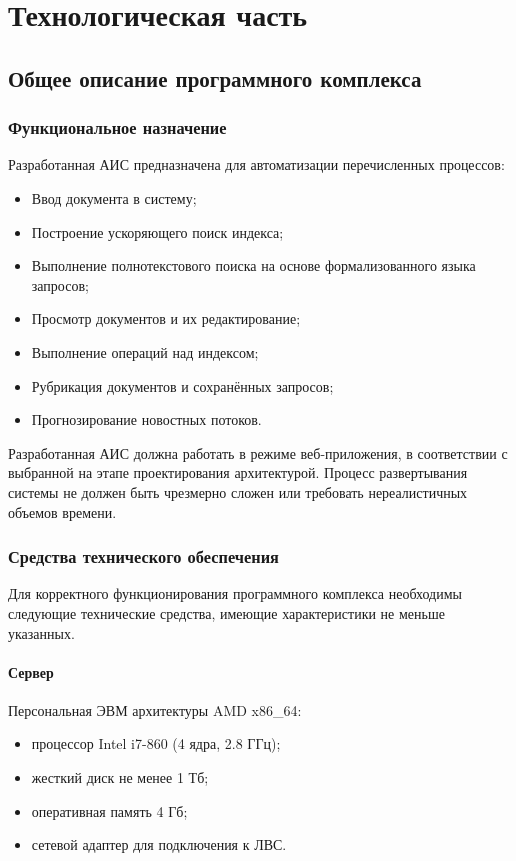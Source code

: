 \section{Технологическая часть}

\subsection{Общее описание программного комплекса}
\subsubsection{Функциональное назначение}

Разработанная АИС предназначена для автоматизации перечисленных процессов:
\begin{itemize}
\item Ввод документа в систему;
\item Построение ускоряющего поиск индекса;
\item Выполнение полнотекстового поиска на основе формализованного языка запросов;
\item Просмотр документов и их редактирование;
\item Выполнение операций над индексом;
\item Рубрикация документов и сохранённых запросов;
\item Прогнозирование новостных потоков.
\end{itemize}

Разработанная АИС должна работать в режиме веб-приложения, в соответствии с выбранной на этапе проектирования архитектурой. Процесс развертывания системы не должен быть чрезмерно сложен или требовать нереалистичных объемов времени.

\subsubsection{Средства технического обеспечения}

Для корректного функционирования программного комплекса необходимы следующие технические средства, имеющие характеристики не меньше указанных.

\paragraph*{Сервер} \hfill

Персональная ЭВМ архитектуры AMD x86\_64:
\begin{itemize}
\item процессор Intel i7-860 (4 ядра, 2.8 ГГц);
\item жесткий диск не менее 1 Тб;
\item оперативная память 4 Гб;
\item сетевой адаптер для подключения к ЛВС.
\end{itemize}

